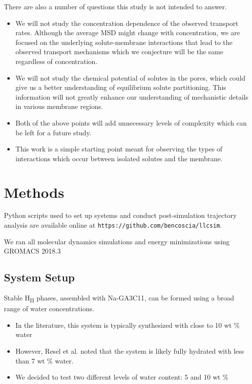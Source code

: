 \documentclass{article}
\begin{document}
  \noindent There are also a number of questions this study is not intended 
  to answer.
  \begin{itemize}
    \item We will not study the concentration dependence of the observed
    transport rates. Although the average MSD might change with concentration,
    we are focused on the underlying solute-membrane interactions that lead to
    the observed transport mechanisms which we conjecture will be the same 
    regardless of concentration.
    \item We will not study the chemical potential of solutes in the pores, which
    could give us a better understanding of equilibrium solute partitioning.
    This information will not greatly enhance our understanding of 
    mechanistic details in various membrane regions.
    \item Both of the above points will add unnecessary levels of complexity
    which can be left for a future study. 
    \item This work is a simple starting point meant for observing the types
    of interactions which occur between isolated solutes and the membrane.
  \end{itemize}

  \section{Methods}
  
  Python scripts used to set up systems and conduct post-simulation trajectory analysis are
  available online at \texttt{https://github.com/bencoscia/llcsim}.
  
  \noindent We ran all molecular dynamics simulations and energy minimizations using 
  GROMACS 2018.3 \cite{bekker_gromacs:_1993,berendsen_gromacs:_1995,van_der_spoel_gromacs:_2005,hess_gromacs_2008} 
  
  \subsection*{System Setup}

  Stable H\textsubscript{II} phases, assembled with Na-GA3C11, can be formed
  using a broad range of water concentrations.
  \begin{itemize}
	\item In the literature, this system is typically synthesized with close
	to 10 wt \% water \cite{smith_ordered_1997, zhou_new_2007}
    \item However, Resel et al. noted that the system is likely fully 
	hydrated with less than 7 wt \% water. \cite{resel_h2-phase_2000}
	\item We decided to test two different levels of water content: 5 and 10 wt \%
  \end{itemize} 
\end{document}
